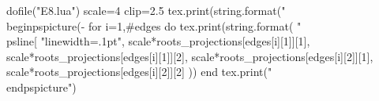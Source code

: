 \documentclass{standalone}
\begin{document}
\begin{luacode*}
dofile("E8.lua")
scale=4
clip=2.5
tex.print(string.format("\\begin{pspicture}(-%
for i=1,#edges do
	tex.print(string.format(
		"\\psline[%
		"linewidth=.1pt",
		scale*roots_projections[edges[i][1]][1],
		scale*roots_projections[edges[i][1]][2],
		scale*roots_projections[edges[i][2]][1],
		scale*roots_projections[edges[i][2]][2]
	))
end
tex.print("\\end{pspicture}")
\end{luacode*}
\end{document}
